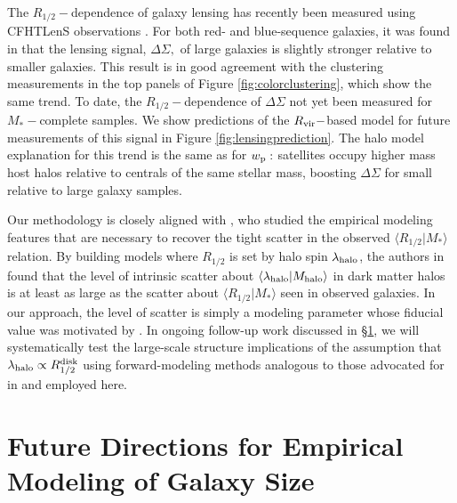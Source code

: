 \documentclass[usenatbib,usegraphicx,letterpaper]{mn2e}
\newcommand{\rhalf}{R_{1/2}}
\newcommand{\mstar}{M_{\ast}}
\newcommand{\mhalo}{M_{\rm halo}}
\newcommand{\rvir}{R_{\rm vir}}
\newcommand{\wproj}{w_{\rm p}}
\newcommand{\mean}[2]{\langle{#1}\vert{#2}\rangle}
\begin{document}
The $\rhalf-$dependence of galaxy lensing has recently been measured using CFHTLenS observations \citep{heymans_etal12,erben_etal13}. For both red- and blue-sequence galaxies, it was found in \citet{charlton_etal17} that the lensing signal, $\Delta\Sigma,$ of large galaxies is slightly stronger relative to smaller galaxies. This result is in good agreement with the clustering measurements in the top panels of Figure \ref{fig:colorclustering}, which show the same trend. To date, the $\rhalf-$dependence of $\Delta\Sigma$ not yet been measured for $\mstar-$complete samples. We show  predictions of the $\rvir-$based model for future measurements of this signal in Figure \ref{fig:lensingprediction}. The halo model explanation for this trend is the same as for $\wproj:$ satellites occupy higher mass host halos relative to centrals of the same stellar mass, boosting $\Delta\Sigma$ for small relative to large galaxy samples.

Our methodology is closely aligned with \citet{somerville_etal17}, who studied the empirical modeling features that are necessary to recover the tight scatter in the observed $\mean{\rhalf}{\mstar}$ relation. By building models where $\rhalf$ is set by halo spin $\lambda_{\rm halo}$, the authors in \citet{somerville_etal17} found that the level of intrinsic scatter about $\langle\lambda_{\rm halo}\vert\mhalo\rangle$ in dark matter halos is at least as large as the scatter about $\langle\rhalf\vert\mstar\rangle$ seen in observed galaxies. In our approach, the level of scatter is simply a modeling parameter whose fiducial value was motivated by \citet{somerville_etal17}. In ongoing follow-up work discussed in \S\ref{sec:future}, we will systematically test the large-scale structure implications of the assumption that $\lambda_{\rm halo}\propto\rhalf^{\rm disk}$ using forward-modeling methods analogous to those advocated for in \citet{somerville_etal17} and employed here.

\section{Future Directions for Empirical Modeling of Galaxy Size}
\label{sec:future}


\end{document}
